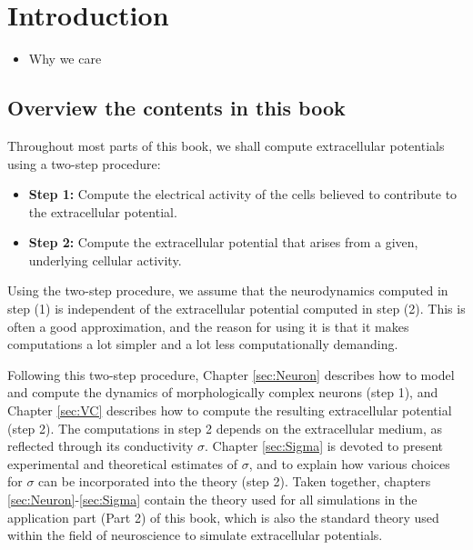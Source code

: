 \section{Introduction} 
\label{sec:Intro}

\begin{itemize}
\item Why we care \citep{Buzsaki2012,Pettersen2012,Einevoll2013,Einevoll2013a,Einevoll2019}
\end{itemize}


\subsection{Overview the contents in this book}
Throughout most parts of this book, we shall compute extracellular potentials using a two-step procedure:  

\begin{itemize}
\item {\bf Step 1:} Compute the electrical activity of the cells believed to contribute to the extracellular potential. 
\item {\bf Step 2:} Compute the extracellular potential that arises from a given, underlying cellular activity.
\end{itemize}

Using the two-step procedure, we assume that the neurodynamics computed in step (1) is independent of the extracellular potential computed in step (2). This is often a good approximation, and the reason for using it is that it makes computations a lot simpler and a lot less computationally demanding. 

Following this two-step procedure, Chapter \ref{sec:Neuron} describes how to model and compute the dynamics of morphologically complex neurons (step 1), and Chapter \ref{sec:VC} describes how to compute the resulting extracellular potential (step 2). The computations in step 2 depends on the extracellular medium, as reflected through its conductivity $\sigma$. Chapter \ref{sec:Sigma} is devoted to present experimental and theoretical estimates of $\sigma$, and to explain how various choices for  $\sigma$ can be incorporated into the theory (step 2). Taken together, chapters \ref{sec:Neuron}-\ref{sec:Sigma} contain the theory used for all simulations in the application part (Part 2) of this book, which is also the standard theory used within the field of neuroscience to simulate extracellular potentials. 

